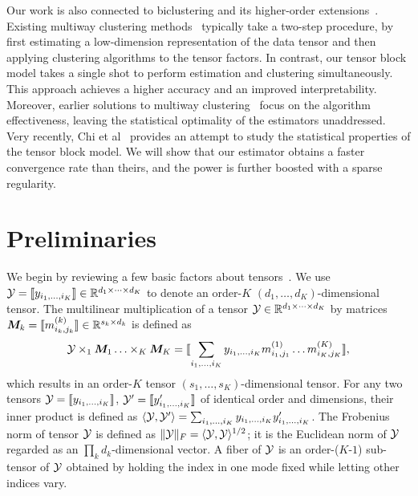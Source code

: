 \documentclass{article}
\begin{document}
Our work is also connected to biclustering and its higher-order extensions~\cite{tan2014sparse,kolda2008scalable,wang2015multi}. Existing multiway clustering methods~\cite{kolda2008scalable,wang2015multi,hore2016tensor} typically take a two-step procedure, by first estimating a low-dimension representation of the data tensor and then applying clustering algorithms to the tensor factors. In contrast, our tensor block model takes a single shot to perform estimation and clustering simultaneously. This approach achieves a higher accuracy and an improved interpretability. Moreover, earlier solutions to multiway clustering~\cite{jegelka2009approximation,kolda2008scalable} focus on the algorithm effectiveness, leaving the statistical optimality of the estimators unaddressed. Very recently, Chi et al~\cite{chi2018provable} provides an attempt to study the statistical properties of the tensor block model. We will show that our estimator obtains a faster convergence rate than theirs, and the power is further boosted with a sparse regularity. 

\vspace{-.1cm}
\section{Preliminaries}
\vspace{-.1cm}
We begin by reviewing a few basic factors about tensors~\cite{kolda2009tensor}. We use $\mathcal{Y}=\llbracket y_{i_1,\ldots,i_K} \rrbracket\in \mathbb{R}^{d_1\times \cdots\times d_K}$ to denote an order-$K$ $(d_1,\ldots,d_K)$-dimensional tensor. The multilinear multiplication of a tensor $\mathcal{Y}\in\mathbb{R}^{d_1\times \cdots\times d_K}$ by matrices $\boldsymbol{M}_k=\llbracket m_{i_k,j_k}^{(k)} \rrbracket\in\mathbb{R}^{s_k\times d_k}$ is defined as
\[
\mathcal{Y} \times_1\boldsymbol{M}_1\ldots \times_K \boldsymbol{M}_K=\llbracket \sum_{i_1,\ldots,i_K}y_{i_1,\ldots,i_K}m_{i_1,j_1}^{(1)}\ldots m_{i_K,j_K}^{(K)} \rrbracket,
\]
which results in an order-$K$ tensor $(s_1,\ldots,s_K)$-dimensional tensor. For any two tensors $\mathcal{Y}=\llbracket y_{i_1,\ldots,i_K} \rrbracket$, $\mathcal{Y}'=\llbracket y'_{i_1,\ldots,i_K} \rrbracket$ of identical order and dimensions, their inner product is defined as $\langle \mathcal{Y}, \mathcal{Y}'\rangle =\sum_{i_1,\ldots,i_K}y_{i_1,\ldots,i_K}y'_{i_1,\ldots,i_K}$. The Frobenius norm of tensor $\mathcal{Y}$ is defined as $\lVert\mathcal{Y}\rVert_F=\langle \mathcal{Y}, \mathcal{Y} \rangle^{1/2}$; it is the Euclidean norm of $\mathcal{Y}$ regarded as an $\prod_k d_k$-dimensional vector. A fiber of $\mathcal{Y}$ is an order-($K$-$1$) sub-tensor of $\mathcal{Y}$ obtained by holding the index in one mode fixed while letting other indices vary. 
\end{document}
